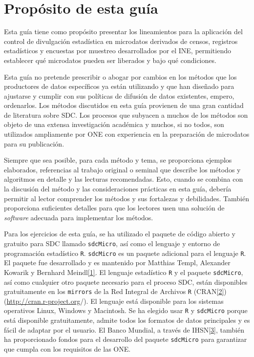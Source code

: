 \documentclass[]{book}
\theoremstyle{definition}
\theoremstyle{definition}
\theoremstyle{definition}
\theoremstyle{definition}
\theoremstyle{remark}
\begin{document}
\hypertarget{propuxf3sito-de-esta-guuxeda}{%
\section{Propósito de esta guía}\label{propuxf3sito-de-esta-guuxeda}}

Esta guía tiene como propósito presentar los lineamientos para la aplicación del control de divulgación estadística en microdatos derivados de censos, registros estadísticos y encuestas por muestreo desarrollados por el INE, permitiendo establecer qué microdatos pueden ser liberados y bajo qué condiciones.

Esta guía no pretende prescribir o abogar por cambios en los métodos que los productores de datos específicos ya están utilizando y que han diseñado para ajustarse y cumplir con sus políticas de difusión de datos existentes, empero, ordenarlos. Los métodos discutidos en esta guía provienen de una gran cantidad de literatura sobre SDC. Los procesos que subyacen a muchos de los métodos son objeto de una extensa investigación académica y muchos, si no todos, son utilizados ampliamente por ONE con experiencia en la preparación de microdatos para su publicación.

Siempre que sea posible, para cada método y tema, se proporciona ejemplos elaborados, referencias al trabajo original o seminal que describe los métodos y algoritmos en detalle y las lecturas recomendadas. Esto, cuando se combina con la discusión del método y las consideraciones prácticas en esta guía, debería permitir al lector comprender los métodos y sus fortalezas y debilidades. También proporciona suficientes detalles para que los lectores usen una solución de \emph{software} adecuada para implementar los métodos.

Para los ejercicios de esta guía, se ha utilizado el paquete de código abierto y gratuito para SDC llamado \texttt{sdcMicro}, así como el lenguaje y entorno de programación estadístico \texttt{R}. \texttt{sdcMicro} es un paquete adicional para el lenguaje \texttt{R}. El paquete fue desarrollado y es mantenido por Matthias Templ, Alexander Kowarik y Bernhard Meindl\protect\hyperlink{_ftn1}{{[}1{]}}. El lenguaje estadístico \texttt{R} y el paquete \texttt{sdcMicro}, así como cualquier otro paquete necesario para el proceso SDC, están disponibles gratuitamente en los \texttt{mirrors} de la Red Integral de Archivos \texttt{R} (CRAN\protect\hyperlink{_ftn2}{{[}2{]}}) (\url{http://cran.r-project.org}/). El lenguaje está disponible para los sistemas operativos Linux, Windows y Macintosh. Se ha elegido usar \texttt{R} y \texttt{sdcMicro} porque está disponible gratuitamente, admite todos los formatos de datos principales y es fácil de adaptar por el usuario. El Banco Mundial, a través de IHSN\protect\hyperlink{_ftn3}{{[}3{]}}, también ha proporcionado fondos para el desarrollo del paquete \texttt{sdcMicro} para garantizar que cumpla con los requisitos de las ONE.
\end{document}
